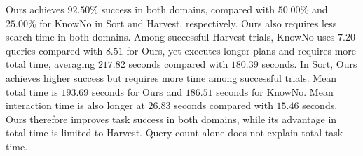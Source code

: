 


Ours achieves $92.50\%$ success in both domains, compared with $50.00\%$ and $25.00\%$ for KnowNo in Sort and Harvest, respectively. Ours also requires less search time in both domains. Among successful Harvest trials, KnowNo uses $7.20$ queries compared with $8.51$ for Ours, yet executes longer plans and requires more total time, averaging $217.82$ seconds compared with $180.39$ seconds. In Sort, Ours achieves higher success but requires more time among successful trials. Mean total time is $193.69$ seconds for Ours and $186.51$ seconds for KnowNo. Mean interaction time is also longer at $26.83$ seconds compared with $15.46$ seconds. Ours therefore improves task success in both domains, while its advantage in total time is limited to Harvest. Query count alone does not explain total task time.

